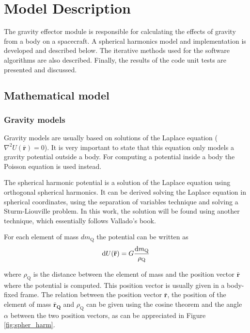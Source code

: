 \section{Model Description}

The gravity effector module is responsible for calculating the effects of gravity from a body on a spacecraft. A spherical harmonics model and implementation is developed and described below. The iterative methods used for the software algorithms are also described. Finally, the results of the code unit tests are presented and discussed.

\subsection{Mathematical model}

\subsubsection{Gravity models}

Gravity models are usually based on solutions of the Laplace equation ($\nabla^2 U(\mathbf{\bar r}) = 0$). It is very important to state that this equation only models a gravity potential outside a body. For computing a potential inside a body the Poisson equation is used instead.

The spherical harmonic potential is a solution of the Laplace equation using orthogonal spherical harmonics. It can be derived solving the Laplace equation in spherical coordinates, using the separation of variables technique and solving a Sturm-Liouville problem. In this work, the solution will be found using another technique, which essentially follows Vallado's book\cite{vallado2013}.

For each element of mass $d m_\text{Q}$ the potential can be written as
\begin{equation}
\D U(\mathbf{\bar r}) = G \frac{\D m_\text{Q}}{\rho_\text{Q}}
\end{equation}

where $\rho_\text{Q}$ is the distance between the element of mass and the position vector $\mathbf{\bar r}$ where the potential is computed. This position vector is usually given in a body-fixed frame. The relation between the position vector $\mathbf{\bar r}$, the position of the element of mass $\mathbf{\bar r_\text{Q}}$ and $\rho_\text{Q}$ can be given using the cosine theorem and the angle $\alpha$ between the two position vectors, as can be appreciated in Figure \ref{fig:spher_harm}.


